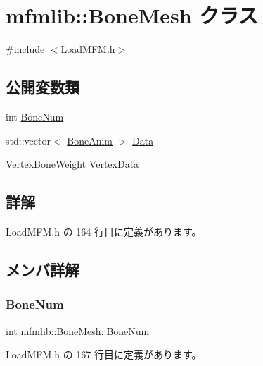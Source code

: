 \hypertarget{classmfmlib_1_1_bone_mesh}{}\section{mfmlib\+:\+:Bone\+Mesh クラス}
\label{classmfmlib_1_1_bone_mesh}


{\ttfamily \#include $<$Load\+M\+F\+M.\+h$>$}

\subsection*{公開変数類}
\begin{DoxyCompactItemize}
\item 
int \mbox{\hyperlink{classmfmlib_1_1_bone_mesh_a56275d3c9a8cc5ca1026f6498b3bedc3}{Bone\+Num}}
\item 
std\+::vector$<$ \mbox{\hyperlink{classmfmlib_1_1_bone_anim}{Bone\+Anim}} $>$ \mbox{\hyperlink{classmfmlib_1_1_bone_mesh_a3ec6ff3ede0f20ad419500c80ce2e6c1}{Data}}
\item 
\mbox{\hyperlink{classmfmlib_1_1_vertex_bone_weight}{Vertex\+Bone\+Weight}} \mbox{\hyperlink{classmfmlib_1_1_bone_mesh_ab252d2d15dc2e927471943a33b19fbc4}{Vertex\+Data}}
\end{DoxyCompactItemize}


\subsection{詳解}


 Load\+M\+F\+M.\+h の 164 行目に定義があります。



\subsection{メンバ詳解}
\mbox{\label{classmfmlib_1_1_bone_mesh_a56275d3c9a8cc5ca1026f6498b3bedc3}} 
\subsubsection{\texorpdfstring{Bone\+Num}{BoneNum}}
{\footnotesize\ttfamily int mfmlib\+::\+Bone\+Mesh\+::\+Bone\+Num}



 Load\+M\+F\+M.\+h の 167 行目に定義があります。

